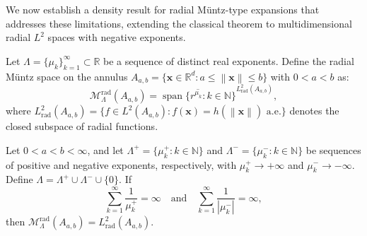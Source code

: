 \documentclass[twoside,11pt]{article}
\newcommand{\R}{\mathbb{R}}
\newcommand{\N}{\mathbb{N}}
\newcommand{\bx}{\bm{x}}
\newcommand{\norm}[1]{\left\|#1\right\|}
\begin{document}
We now establish a density result for radial Müntz-type expansions that addresses these limitations, extending the classical theorem to multidimensional radial $L^2$ spaces with negative exponents.

\begin{definition}
	\label{def:radial_muntz_space}
	Let $\Lambda = \{\mu_k\}_{k=1}^\infty \subset \R$ be a sequence of distinct real exponents. Define the radial Müntz space on the annulus $A_{a,b} = \{\bx \in \R^d : a \leq \norm{\bx} \leq b\}$ with $0 < a < b$ as:
	\begin{equation}
		\mathcal{M}_\Lambda^{\mathrm{rad}}(A_{a,b}) = \overline{\operatorname{span}\{r^{\mu_k} : k \in \N\}}^{L^2_{\mathrm{rad}}(A_{a,b})},
	\end{equation}
	where $L^2_{\mathrm{rad}}(A_{a,b}) = \{f \in L^2(A_{a,b}) : f(\bx) = h(\norm{\bx}) \text{ a.e.}\}$ denotes the closed subspace of radial functions.
\end{definition}

\begin{theorem}
	\label{thm:radial_density}
	Let $0 < a < b < \infty$, and let $\Lambda^+ = \{\mu_k^+ : k \in \N\}$ and $\Lambda^- = \{\mu_k^- : k \in \N\}$ be sequences of positive and negative exponents, respectively, with $\mu_k^+ \to +\infty$ and $\mu_k^- \to -\infty$. Define $\Lambda = \Lambda^+ \cup \Lambda^- \cup \{0\}$. If
	\begin{equation}
		\sum_{k=1}^\infty \frac{1}{\mu_k^+} = \infty \quad \text{and} \quad \sum_{k=1}^\infty \frac{1}{|\mu_k^-|} = \infty,
		\label{eq:bilateral_muntz}
	\end{equation}
	then $\mathcal{M}_\Lambda^{\mathrm{rad}}(A_{a,b}) = L^2_{\mathrm{rad}}(A_{a,b})$.
\end{theorem}
\end{document}
